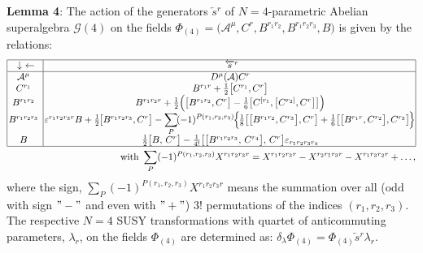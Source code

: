 \documentclass[10pt]{article}
\begin{document}
\noindent
\textbf{Lemma  4}: The action of the generators  $\overleftarrow{s}{}^{r}$ of $N=4$-parametric  Abelian superalgebra $\mathcal{G}(4)$ on the fields $\Phi_{(4)}=\big(\mathcal{A}^\mu,C^r, B^{r_1r_2}, B^{r_1r_2r_3},B\big)$ is given by the relations:
 \begin{eqnarray}
&\hspace{-0.5em}&\hspace{-0.5em}\begin{array}{|c|c |}\hline%
  \downarrow \  \leftarrow \!&\!  \overleftarrow{s}{}^{r}\!\! \!\! \\
   \hline%
    \! \! \mathcal{A}^\mu &\! D^\mu(\mathcal{A}) C^r \!\!   \\
 \!\! C^{r_1}    &\! B^{r_1r}+%
\textstyle\frac{1}{2}\big[C^{r_1}, C^{r}\big] \!\!   \\
 \!\! B^{r_1r_2}    &\! {B}^{r_1r_2r}+ \textstyle\frac{1}{2}\Big(
\big[B^{r_1r_2}, C^{r}\big]-\frac{1}{6}\big[C^{[r_1},\big[C^{r_2]},C^{r}\big]\big]\Big) \!\!   \\
    \!\! B^{r_1r_2r_3}    &\! \hspace{-0.2em}\varepsilon^{r_1r_2r_3r}{B}+\textstyle\frac{1}{2}\hspace{-0.1em}\big[B^{r_1r_2r_3},C^r\big] - \displaystyle\sum_{P}\hspace{-0.15em}(-1)^{P(r_1,r_2,r_3)}\hspace{-0.1em}\Big\{\hspace{-0.1em}\textstyle\frac{1}{8}\big[\big[B^{r_1r_2},C^{r_3}\big],C^r\big] +\frac{1}{6} \big[\big[B^{r_1r},C^{r_2}\big],C^{r_3}\big] \hspace{-0.1em} \Big\} \hspace{-0.1em} \!\!   \\
 \!\! B   &\! \textstyle\frac{1}{2}\big[{B},\,C^r\big] - \frac{1}{4!}\big[\big[B^{r_1r_2r_3},\,C^{r_4}\big],\,C^r\big] \varepsilon_{r_1r_2r_3r_4} \!\!   \\
     \cline{1-2}%
\end{array} \nonumber \\
&\hspace{-0.5em}&\hspace{-0.5em} \ \mathrm{with} \ \sum_{P}(-1)^{P(r_1,r_2,r_3)} X^{r_1r_2r_3r} =X^{r_1r_2r_3r}-X^{r_2r_1r_3r}- X^{r_1r_3r_2r} + \ldots, \label{minN4}\end{eqnarray}
where the sign, $\sum_{P}(-1)^{P(r_1,r_2,r_3)} X^{r_1r_2r_3r}$ means the summation over all (odd with sign $"-"$ and even with $"+"$) $3!$  permutations  of the indices  $(r_1,r_2,r_3)$.
The respective $N=4$ SUSY transformations with quartet of anticommuting parameters, $\lambda_r$, on the fields $\Phi_{(4)}$  are determined  as: $\delta_\lambda \Phi_{(4)} = \Phi_{(4)} \overleftarrow{s}{}^{r} \lambda_r $.
\end{document}
